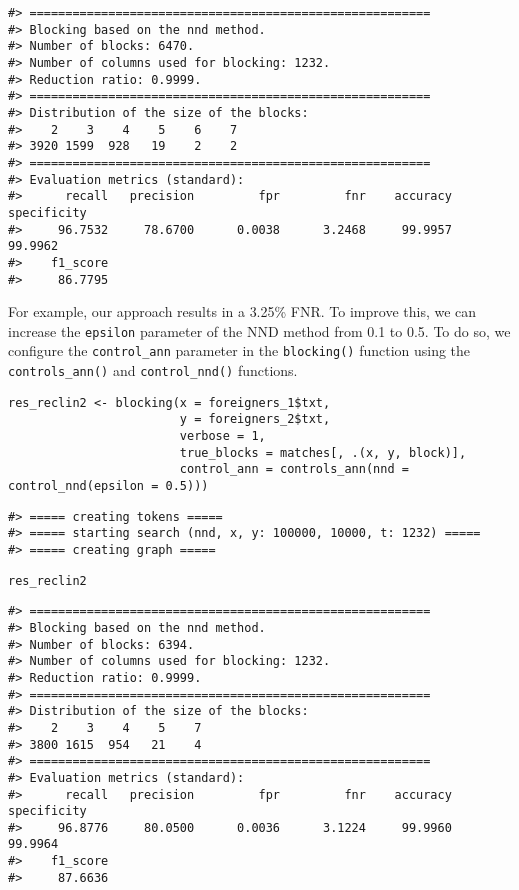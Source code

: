 \begin{verbatim}
#> ========================================================
#> Blocking based on the nnd method.
#> Number of blocks: 6470.
#> Number of columns used for blocking: 1232.
#> Reduction ratio: 0.9999.
#> ========================================================
#> Distribution of the size of the blocks:
#>    2    3    4    5    6    7 
#> 3920 1599  928   19    2    2 
#> ========================================================
#> Evaluation metrics (standard):
#>      recall   precision         fpr         fnr    accuracy specificity 
#>     96.7532     78.6700      0.0038      3.2468     99.9957     99.9962 
#>    f1_score 
#>     86.7795
\end{verbatim}

For example, our approach results in a
3.25\% FNR.
To improve this, we can increase the \texttt{epsilon} parameter of
the NND method from 0.1 to 0.5. To do so, we configure the \texttt{control\_ann}
parameter in the \texttt{blocking()} function using the \texttt{controls\_ann()} and
\texttt{control\_nnd()} functions.

\begin{verbatim}
res_reclin2 <- blocking(x = foreigners_1$txt,
                        y = foreigners_2$txt,
                        verbose = 1,
                        true_blocks = matches[, .(x, y, block)],
                        control_ann = controls_ann(nnd = control_nnd(epsilon = 0.5)))
\end{verbatim}

\begin{verbatim}
#> ===== creating tokens =====
#> ===== starting search (nnd, x, y: 100000, 10000, t: 1232) =====
#> ===== creating graph =====
\end{verbatim}

\begin{verbatim}
res_reclin2
\end{verbatim}

\begin{verbatim}
#> ========================================================
#> Blocking based on the nnd method.
#> Number of blocks: 6394.
#> Number of columns used for blocking: 1232.
#> Reduction ratio: 0.9999.
#> ========================================================
#> Distribution of the size of the blocks:
#>    2    3    4    5    7 
#> 3800 1615  954   21    4 
#> ========================================================
#> Evaluation metrics (standard):
#>      recall   precision         fpr         fnr    accuracy specificity 
#>     96.8776     80.0500      0.0036      3.1224     99.9960     99.9964 
#>    f1_score 
#>     87.6636
\end{verbatim}

